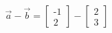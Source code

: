 \documentclass[preview]{standalone}
\begin{document}
\begin{align*}
\vec{a} - \vec{b} = \begin{bmatrix} \text{-}1 \\ 2 \end{bmatrix} - \begin{bmatrix} 2 \\ 3 \end{bmatrix}
\end{align*}
\end{document}
